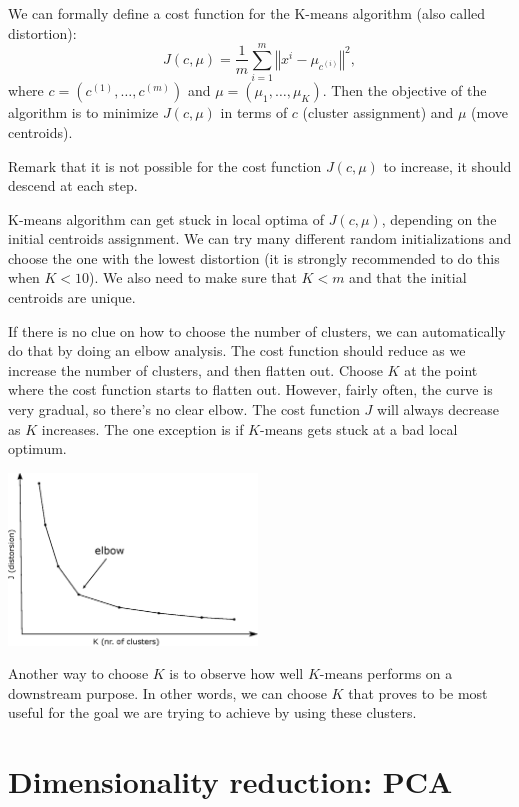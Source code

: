 \documentclass[a4paper,11pt]{report}
\newcommand{\norm}[1]{\left\Vert#1\right\Vert}
\begin{document}
We can formally define a cost function for the K-means algorithm (also called distortion):
$$J(c, \mu) = \dfrac{1}{m} \sum_{i=1}^{m}{\norm{x^i - \mu_{c^{(i)}}}^2},$$ where $c = (c^{(1)}, \ldots, c^{(m)})$ and $\mu = (\mu_1, \ldots, \mu_K)$.
Then the objective of the algorithm is to minimize $J(c, \mu)$ in terms of $c$ (cluster assignment) and $\mu$ (move centroids).

Remark that it is not possible for the cost function $J(c, \mu)$ to increase, it should descend at each step.

K-means algorithm can get stuck in local optima of $J(c, \mu)$, depending on the initial centroids assignment. We can try many different random initializations and choose the one with the lowest distortion (it is strongly recommended to do this when $K<10$). We also need to make sure that $K < m$ and that the initial centroids are unique.

If there is no clue on how to choose the number of clusters, we can automatically do that by doing an elbow analysis.  The cost function should reduce as we increase the number of clusters, and then flatten out. Choose $K$ at the point where the cost function starts to flatten out. However, fairly often, the curve is very gradual, so there's no clear elbow. The cost function $J$ will always decrease as $K$ increases. The one exception is if $K$-means gets stuck at a bad local optimum.

\hspace{1.0in}
\begin{center}
\includegraphics[height = 1.8in]{Images/elbow}
\end{center}

Another way to choose $K$ is to observe how well $K$-means performs on a downstream purpose. In other words, we can choose $K$ that proves to be most useful for the goal we are trying to achieve by using these clusters.


\section{Dimensionality reduction: PCA}
\end{document}
